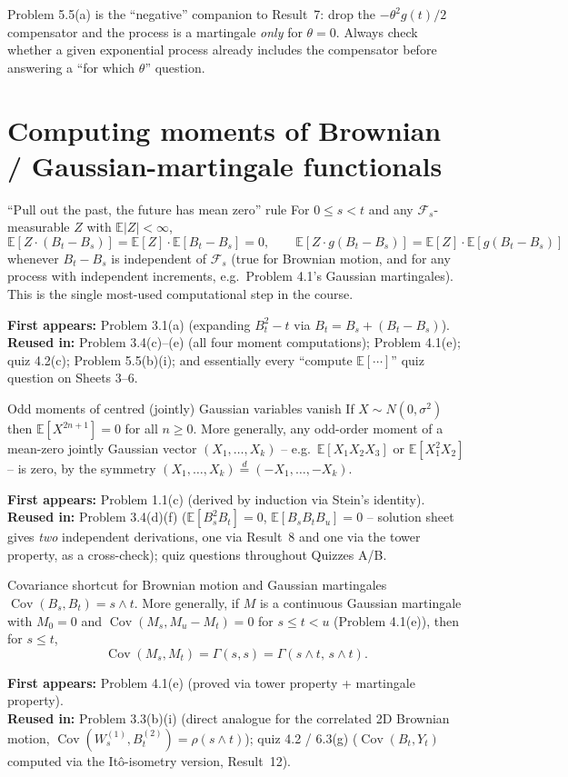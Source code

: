 \documentclass[11pt]{article}
\newcommand{\E}{\mathbb{E}}
\newcommand{\F}{\mathcal F}
\DeclareMathOperator{\Cov}{Cov}
\newcommand{\used}[2]{\begin{sourcebox}\textbf{First appears:} #1 \\ \textbf{Reused in:} #2\end{sourcebox}}
\begin{document}
\begin{trap}
Problem 5.5(a) is the ``negative'' companion to Result~7: drop the
$-\theta^2g(t)/2$ compensator and the process is a martingale \emph{only} for
$\theta=0$. Always check whether a given exponential process already includes
the compensator before answering a ``for which $\theta$'' question.
\end{trap}

\section{Computing moments of Brownian / Gaussian-martingale functionals}

\begin{result}{``Pull out the past, the future has mean zero'' rule}
\label{res:8}
For $0\le s<t$ and any $\F_s$-measurable $Z$ with $\E|Z|<\infty$,
\[
\E[Z\cdot(B_t-B_s)]=\E[Z]\cdot\E[B_t-B_s]=0,
\qquad
\E[Z\cdot g(B_t-B_s)]=\E[Z]\cdot\E[g(B_t-B_s)]
\]
whenever $B_t-B_s$ is independent of $\F_s$ (true for Brownian motion, and for any
process with independent increments, e.g.\ Problem 4.1's Gaussian martingales).
This is the single most-used computational step in the course.
\end{result}
\used{Problem 3.1(a) (expanding $B_t^2-t$ via $B_t=B_s+(B_t-B_s)$).}{Problem
3.4(c)--(e) (all four moment computations); Problem 4.1(e); quiz 4.2(c); Problem
5.5(b)(i); and essentially every ``compute $\E[\cdots]$'' quiz question on
Sheets 3--6.}

\begin{result}{Odd moments of centred (jointly) Gaussian variables vanish}
\label{res:9}
If $X\sim N(0,\sigma^2)$ then $\E[X^{2n+1}]=0$ for all $n\ge0$. More generally,
any odd-order moment of a mean-zero jointly Gaussian vector
$(X_1,\dots,X_k)$ -- e.g.\ $\E[X_1X_2X_3]$ or $\E[X_1^2X_2]$ -- is zero, by the
symmetry $(X_1,\dots,X_k)\overset{d}=(-X_1,\dots,-X_k)$.
\end{result}
\used{Problem 1.1(c) (derived by induction via Stein's identity).}{Problem
3.4(d)(f) ($\E[B_s^2B_t]=0$, $\E[B_sB_tB_u]=0$ -- solution sheet gives \emph{two}
independent derivations, one via Result~8 and one via the tower property, as a
cross-check); quiz questions throughout Quizzes A/B.}

\begin{result}{Covariance shortcut for Brownian motion and Gaussian martingales}
\label{res:10}
$\Cov(B_s,B_t)=s\wedge t$. More generally, if $M$ is a continuous Gaussian
martingale with $M_0=0$ and $\Cov(M_s,M_u-M_t)=0$ for $s\le t<u$ (Problem
4.1(e)), then for $s\le t$,
\[
\Cov(M_s,M_t)=\Gamma(s,s)=\Gamma(s\wedge t,\,s\wedge t).
\]
\end{result}
\used{Problem 4.1(e) (proved via tower property + martingale property).}{Problem
3.3(b)(i) (direct analogue for the correlated 2D Brownian motion,
$\Cov(W^{(1)}_s,B^{(2)}_t)=\rho(s\wedge t)$); quiz 4.2 / 6.3(g)
($\Cov(B_t,Y_t)$ computed via the Itô-isometry version, Result~12).}
\end{document}
